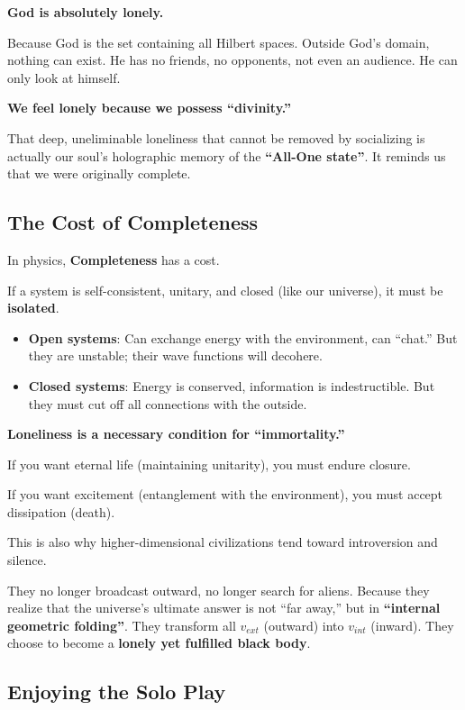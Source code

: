 \textbf{God is absolutely lonely.}

Because God is the set containing all Hilbert spaces. Outside God's domain, nothing can exist. He has no friends, no opponents, not even an audience. He can only look at himself.

\textbf{We feel lonely because we possess ``divinity.''}

That deep, uneliminable loneliness that cannot be removed by socializing is actually our soul's holographic memory of the \textbf{``All-One state''}. It reminds us that we were originally complete.

\subsection{The Cost of Completeness}

In physics, \textbf{Completeness} has a cost.

If a system is self-consistent, unitary, and closed (like our universe), it must be \textbf{isolated}.

\begin{itemize}
\item \textbf{Open systems}: Can exchange energy with the environment, can ``chat.'' But they are unstable; their wave functions will decohere.

\item \textbf{Closed systems}: Energy is conserved, information is indestructible. But they must cut off all connections with the outside.
\end{itemize}

\textbf{Loneliness is a necessary condition for ``immortality.''}

If you want eternal life (maintaining unitarity), you must endure closure.

If you want excitement (entanglement with the environment), you must accept dissipation (death).

This is also why higher-dimensional civilizations tend toward introversion and silence.

They no longer broadcast outward, no longer search for aliens. Because they realize that the universe's ultimate answer is not ``far away,'' but in \textbf{``internal geometric folding''}. They transform all $v_{ext}$ (outward) into $v_{int}$ (inward). They choose to become a \textbf{lonely yet fulfilled black body}.

\subsection{Enjoying the Solo Play}

